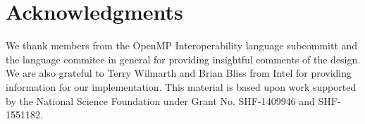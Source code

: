 \documentclass{llncs}
\newcommand{\othertm}{\textsuperscript{$\star$}}
\begin{document}
\section*{Acknowledgments}
We thank members from the OpenMP Interoperability language subcommitt and the language 
commitee in general for providing insightful comments of the design. 
We are also grateful to Terry Wilmarth and Brian Bliss from Intel for providing information for our 
implementation. 
This material is based upon work supported by the National
Science Foundation under Grant No. SHF-1409946 and SHF-1551182. 
%

\small{


}
\end{document}
